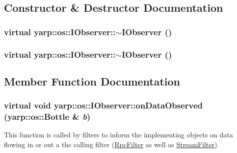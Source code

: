 \subsection{Constructor \& Destructor Documentation}
\hypertarget{classyarp_1_1os_1_1_i_observer_a6e20a4a7baa318b53d6a7e3f198699f6}{
\subsubsection[{$\sim$IObserver}]{\setlength{\rightskip}{0pt plus 5cm}virtual yarp::os::IObserver::$\sim$IObserver ()}}
\label{classyarp_1_1os_1_1_i_observer_a6e20a4a7baa318b53d6a7e3f198699f6}
\hypertarget{classyarp_1_1os_1_1_i_observer_a6e20a4a7baa318b53d6a7e3f198699f6}{
\subsubsection[{$\sim$IObserver}]{\setlength{\rightskip}{0pt plus 5cm}virtual yarp::os::IObserver::$\sim$IObserver ()}}
\label{classyarp_1_1os_1_1_i_observer_a6e20a4a7baa318b53d6a7e3f198699f6}


\subsection{Member Function Documentation}
\hypertarget{classyarp_1_1os_1_1_i_observer_a4829e5a6f2ba6666b9539a4a30f20790}{
\subsubsection[{onDataObserved}]{\setlength{\rightskip}{0pt plus 5cm}virtual void yarp::os::IObserver::onDataObserved (yarp::os::Bottle \& {\em b})}}
\label{classyarp_1_1os_1_1_i_observer_a4829e5a6f2ba6666b9539a4a30f20790}
This function is called by filters to inform the implementing objects on data flowing in or out a the calling filter (\hyperlink{classyarp_1_1os_1_1_rpc_filter}{RpcFilter} as well as \hyperlink{classyarp_1_1os_1_1_stream_filter}{StreamFilter}). 

